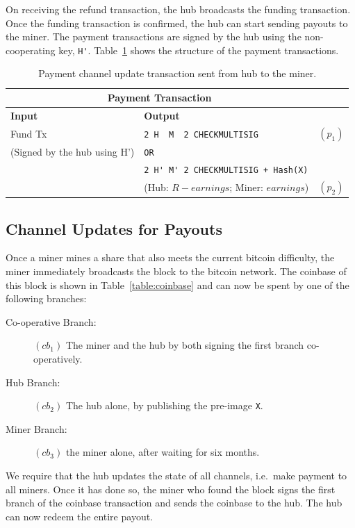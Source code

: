\documentclass{article}
\begin{document}
On receiving the refund transaction, the hub broadcasts the funding
transaction. Once the funding transaction is confirmed, the hub can
start sending payouts to the miner. The payment transactions are
signed by the hub using the non-cooperating key, \verb|H'|.
Table~\ref{payment-transaction} shows the structure of the payment
transactions.


\begin{table}
  \centering
  \begin{tabular}{ llr }
    \multicolumn{2}{c}{\bfseries Payment Transaction} \\
    \midrule
    \bfseries Input & \bfseries Output \\
    \midrule
    Fund Tx & \verb|2 H  M  2 CHECKMULTISIG| & $(p_1)$ \\
    (Signed by the hub using H') & \verb|OR| \\
                    & \verb|2 H' M' 2 CHECKMULTISIG + Hash(X)| \\
                    & (Hub: $R - earnings$; Miner: $earnings$) & $(p_2)$\\
    \midrule
  \end{tabular}
  \caption{Payment channel update transaction sent from hub to the
    miner.}\label{payment-transaction}
\end{table}

\subsection{Channel Updates for Payouts}\label{sec:channel-update}

Once a miner mines a share that also meets the current bitcoin
difficulty, the miner immediately broadcasts the block to the bitcoin
network. The coinbase of this block is shown in
Table~\ref{table:coinbase} and can now be spent by one of the following
branches:

\begin{description}
\item[Co-operative Branch:] $(cb_1)$ The miner and the hub by both signing the
  first branch co-operatively.
\item[Hub Branch:] $(cb_2)$ The hub alone, by publishing the pre-image \verb|X|.
\item[Miner Branch:] $(cb_3)$ the miner alone, after waiting for six months.
\end{description}

We require that the hub updates the state of all channels, i.e.\ make
payment to all miners. Once it has done so, the miner who found the
block signs the first branch of the coinbase transaction and sends the
coinbase to the hub. The hub can now redeem the entire payout.
\end{document}
